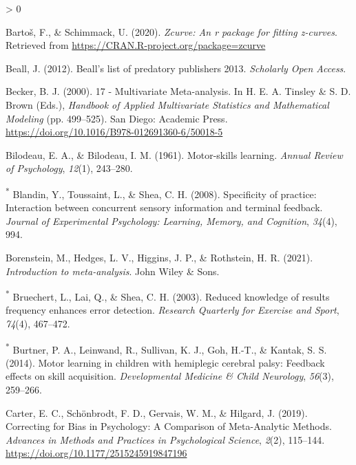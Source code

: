 \documentclass[
  english,
  man, donotrepeattitle,mask,floatsintext]{apa7}
\newlength{\cslhangindent}
\newenvironment{CSLReferences}[2] %
 {%
  \setlength{\parindent}{0pt}
  \ifodd #1 \everypar{\setlength{\hangindent}{\cslhangindent}}\ignorespaces\fi
  \ifnum #2 > 0
  \setlength{\parskip}{#2\baselineskip}
  \fi
 }%
 {}
\begin{document}
\begin{CSLReferences}{1}{0}
\leavevmode\hypertarget{ref-Bartoux1612020}{}%
Bartoš, F., \& Schimmack, U. (2020). \emph{Zcurve: An r package for fitting z-curves}. Retrieved from \url{https://CRAN.R-project.org/package=zcurve}

\leavevmode\hypertarget{ref-Beall2012}{}%
Beall, J. (2012). Beall's list of predatory publishers 2013. \emph{Scholarly Open Access}.

\leavevmode\hypertarget{ref-Becker2000}{}%
Becker, B. J. (2000). 17 - {Multivariate} {Meta}-analysis. In H. E. A. Tinsley \& S. D. Brown (Eds.), \emph{Handbook of {Applied} {Multivariate} {Statistics} and {Mathematical} {Modeling}} (pp. 499--525). San Diego: Academic Press. \url{https://doi.org/10.1016/B978-012691360-6/50018-5}

\leavevmode\hypertarget{ref-Bilodeau1961}{}%
Bilodeau, E. A., \& Bilodeau, I. M. (1961). Motor-skills learning. \emph{Annual Review of Psychology}, \emph{12}(1), 243--280.

\leavevmode\hypertarget{ref-Blandin2008}{}%
\textsuperscript{*} Blandin, Y., Toussaint, L., \& Shea, C. H. (2008). Specificity of practice: Interaction between concurrent sensory information and terminal feedback. \emph{Journal of Experimental Psychology: Learning, Memory, and Cognition}, \emph{34}(4), 994.

\leavevmode\hypertarget{ref-Borenstein2021}{}%
Borenstein, M., Hedges, L. V., Higgins, J. P., \& Rothstein, H. R. (2021). \emph{Introduction to meta-analysis}. John Wiley \& Sons.

\leavevmode\hypertarget{ref-Bruechert2003}{}%
\textsuperscript{*} Bruechert, L., Lai, Q., \& Shea, C. H. (2003). Reduced knowledge of results frequency enhances error detection. \emph{Research Quarterly for Exercise and Sport}, \emph{74}(4), 467--472.

\leavevmode\hypertarget{ref-Burtner2014}{}%
\textsuperscript{*} Burtner, P. A., Leinwand, R., Sullivan, K. J., Goh, H.-T., \& Kantak, S. S. (2014). Motor learning in children with hemiplegic cerebral palsy: Feedback effects on skill acquisition. \emph{Developmental Medicine \& Child Neurology}, \emph{56}(3), 259--266.

\leavevmode\hypertarget{ref-Carter2019}{}%
Carter, E. C., Schönbrodt, F. D., Gervais, W. M., \& Hilgard, J. (2019). Correcting for {Bias} in {Psychology}: {A} {Comparison} of {Meta}-{Analytic} {Methods}. \emph{Advances in Methods and Practices in Psychological Science}, \emph{2}(2), 115--144. \url{https://doi.org/10.1177/2515245919847196}


\end{CSLReferences}
\end{document}
